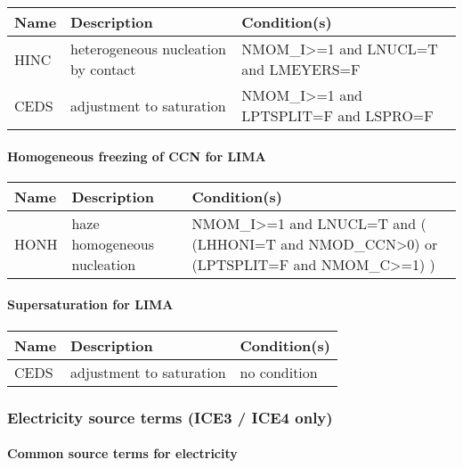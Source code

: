 \begin{longtable} {|p{}|p{}|p{}|}
\hline
Name & Description & Condition(s) \\
\hline \hline
\endhead
HINC   & heterogeneous nucleation by contact & NMOM\_I>=1 and LNUCL=T and LMEYERS=F \\\hline
CEDS   & adjustment to saturation            & NMOM\_I>=1 and LPTSPLIT=F and LSPRO=F \\\hline
\end{longtable}

\paragraph{Homogeneous freezing of CCN for LIMA}
\mbox{} %

\begin{longtable} {|p{}|p{}|p{}|}
\hline
Name & Description & Condition(s) \\
\hline \hline
\endhead
HONH   & haze homogeneous nucleation & NMOM\_I>=1 and LNUCL=T and ( (LHHONI=T and NMOD\_CCN>0) or (LPTSPLIT=F and NMOM\_C>=1) ) \\\hline
\end{longtable}

\paragraph{Supersaturation for LIMA}
\mbox{} %

\begin{longtable} {|p{}|p{}|p{}|}
\hline
Name & Description & Condition(s) \\
\hline \hline
\endhead
CEDS   & adjustment to saturation & no condition \\\hline
\end{longtable}


\subsubsection{Electricity source terms (ICE3 / ICE4 only)}

\paragraph{Common source terms for electricity}
\mbox{} %

